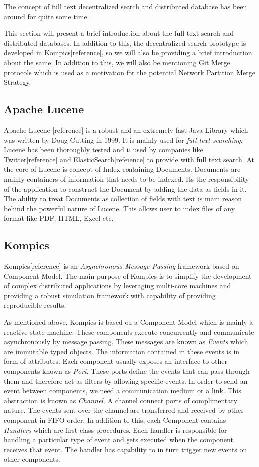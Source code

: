 \documentclass[a4paper, 11pt]{article}
\begin{document}
The concept of full text decentralized search and distributed database has been around for quite some time. 


This section will present a brief introduction about the full text search and distributed databases. In addition to this, the decentralized search prototype is developed in Kompics[reference], so we will also be providing a brief introduction about the same. In addition to this, we will also be mentioning Git Merge protocols which is used as a motivation for the potential Network Partition Merge Strategy.


\subsection*{Apache Lucene}

Apache Lucene [reference] is a robust and an extremely fast Java Library which was written by Doug Cutting in 1999. It is mainly used for \textit{full text searching}. Lucene has been thoroughly tested and is used by companies like Twitter[reference] and ElasticSearch[reference] to provide with full text search. At the core of Lucene is concept of Index containing Documents. Documents are mainly containers of information that needs to be indexed. Its the responsibility of the application to construct the Document by adding the data as fields in it. The ability to treat Documents as collection of fields with text is main reason behind the powerful nature of Lucene. This allows user to index files of any format like PDF, HTML, Excel etc. 

\subsection*{Kompics}
Kompics[reference] is an \textit{Asynchronous Message Passing} framework based on Component Model. The main purpose of Kompics is to simplify the development of complex distributed applications by leveraging multi-core machines and providing a robust simulation framework with capability of providing reproducible results. 
\par As mentioned above, Kompics is based on a Component Model which is mainly a reactive state machine. These components execute concurrently and communicate asynchronously by message passing. These messages are known as \textit{Events} which are immutable typed objects. The information contained in these events is in form of attributes. Each component usually exposes an interface to other components known as \textit{Port}. These ports define the events that can pass through them and therefore act as filters by allowing specific events. In order to send an event between components, we need a communication medium or a link. This abstraction is known as \textit{Channel}. A channel connect ports of complimentary nature. The events sent over the channel are transferred and received by other component in FIFO order. In addition to this, each Component contains \textit{Handlers} which are first class procedures. Each handler is responsible for handling a particular type of event and gets executed when the component receives that event. The handler has capability to in turn trigger new events on other components. 
\end{document}
